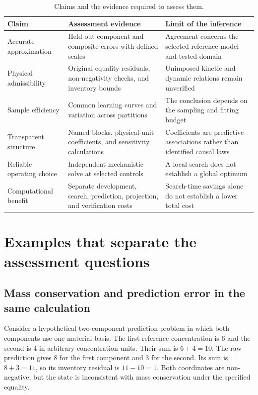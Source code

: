 \begin{table}[htbp]
\centering
\caption{Claims and the evidence required to assess them.}
\label{tab:claim_evidence}
\small
\begin{tabular}{p{}p{}p{}}
\toprule
Claim & Assessment evidence & Limit of the inference \\
\midrule
Accurate approximation & Held-out component and composite errors with defined scales & Agreement concerns the selected reference model and tested domain \\
Physical admissibility & Original equality residuals, non-negativity checks, and inventory bounds & Unimposed kinetic and dynamic relations remain unverified \\
Sample efficiency & Common learning curves and variation across partitions & The conclusion depends on the sampling and fitting budget \\
Transparent structure & Named blocks, physical-unit coefficients, and sensitivity calculations & Coefficients are predictive associations rather than identified causal laws \\
Reliable operating choice & Independent mechanistic solve at selected controls & A local search does not establish a global optimum \\
Computational benefit & Separate development, search, prediction, projection, and verification costs & Search-time savings alone do not establish a lower total cost \\
\bottomrule
\end{tabular}
\end{table}

\section{Examples that separate the assessment questions}

\subsection{Mass conservation and prediction error in the same calculation}

Consider a hypothetical two-component prediction problem in which both components use one material basis. The first reference concentration is 6 and the second is 4 in arbitrary concentration units. Their sum is $6+4=10$. The raw prediction gives 8 for the first component and 3 for the second. Its sum is $8+3=11$, so its inventory residual is $11-10=1$. Both coordinates are non-negative, but the state is inconsistent with mass conservation under the specified equality.

